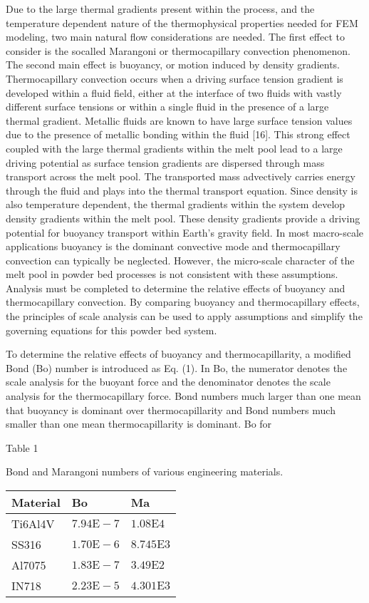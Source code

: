 \documentclass[10pt]{article}
\begin{document}
Due to the large thermal gradients present within the process, and the temperature dependent nature of the thermophysical properties needed for FEM modeling, two main natural flow considerations are needed. The first effect to consider is the socalled Marangoni or thermocapillary convection phenomenon. The second main effect is buoyancy, or motion induced by density gradients. Thermocapillary convection occurs when a driving surface tension gradient is developed within a fluid field, either at the interface of two fluids with vastly different surface tensions or within a single fluid in the presence of a large thermal gradient. Metallic fluids are known to have large surface tension values due to the presence of metallic bonding within the fluid [16]. This strong effect coupled with the large thermal gradients within the melt pool lead to a large driving potential as surface tension gradients are dispersed through mass transport across the melt pool. The transported mass advectively carries energy through the fluid and plays into the thermal transport equation. Since density is also temperature dependent, the thermal gradients within the system develop density gradients within the melt pool. These density gradients provide a driving potential for buoyancy transport within Earth's gravity field. In most macro-scale applications buoyancy is the dominant convective mode and thermocapillary convection can typically be neglected. However, the micro-scale character of the melt pool in powder bed processes is not consistent with these assumptions. Analysis must be completed to determine the relative effects of buoyancy and thermocapillary convection. By comparing buoyancy and thermocapillary effects, the principles of scale analysis can be used to apply assumptions and simplify the governing equations for this powder bed system.

To determine the relative effects of buoyancy and thermocapillarity, a modified Bond (Bo) number is introduced as Eq. (1). In Bo, the numerator denotes the scale analysis for the buoyant force and the denominator denotes the scale analysis for the thermocapillary force. Bond numbers much larger than one mean that buoyancy is dominant over thermocapillarity and Bond numbers much smaller than one mean thermocapillarity is dominant. Bo for

Table 1

Bond and Marangoni numbers of various engineering materials.

\begin{center}
\begin{tabular}{lll}
\hline
Material & Bo & Ma \\
\hline
Ti6Al4V & $7.94 \mathrm{E}-7$ & $1.08 \mathrm{E} 4$ \\
SS316 & $1.70 \mathrm{E}-6$ & $8.745 \mathrm{E} 3$ \\
Al7075 & $1.83 \mathrm{E}-7$ & $3.49 \mathrm{E} 2$ \\
IN718 & $2.23 \mathrm{E}-5$ & $4.301 \mathrm{E} 3$ \\
\hline
\end{tabular}
\end{center}
\end{document}
